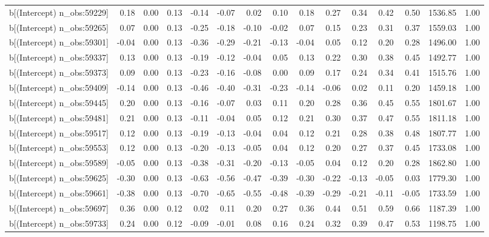 \begin{table}[ht]
\begin{tabular}{rrrrrrrrrrrrrrr}
  b[(Intercept) n\_obs:59229] & 0.18 & 0.00 & 0.13 & -0.14 & -0.07 & 0.02 & 0.10 & 0.18 & 0.27 & 0.34 & 0.42 & 0.50 & 1536.85 & 1.00 \\ 
  b[(Intercept) n\_obs:59265] & 0.07 & 0.00 & 0.13 & -0.25 & -0.18 & -0.10 & -0.02 & 0.07 & 0.15 & 0.23 & 0.31 & 0.37 & 1559.03 & 1.00 \\ 
  b[(Intercept) n\_obs:59301] & -0.04 & 0.00 & 0.13 & -0.36 & -0.29 & -0.21 & -0.13 & -0.04 & 0.05 & 0.12 & 0.20 & 0.28 & 1496.00 & 1.00 \\ 
  b[(Intercept) n\_obs:59337] & 0.13 & 0.00 & 0.13 & -0.19 & -0.12 & -0.04 & 0.05 & 0.13 & 0.22 & 0.30 & 0.38 & 0.45 & 1492.77 & 1.00 \\ 
  b[(Intercept) n\_obs:59373] & 0.09 & 0.00 & 0.13 & -0.23 & -0.16 & -0.08 & 0.00 & 0.09 & 0.17 & 0.24 & 0.34 & 0.41 & 1515.76 & 1.00 \\ 
  b[(Intercept) n\_obs:59409] & -0.14 & 0.00 & 0.13 & -0.46 & -0.40 & -0.31 & -0.23 & -0.14 & -0.06 & 0.02 & 0.11 & 0.20 & 1459.18 & 1.00 \\ 
  b[(Intercept) n\_obs:59445] & 0.20 & 0.00 & 0.13 & -0.16 & -0.07 & 0.03 & 0.11 & 0.20 & 0.28 & 0.36 & 0.45 & 0.55 & 1801.67 & 1.00 \\ 
  b[(Intercept) n\_obs:59481] & 0.21 & 0.00 & 0.13 & -0.11 & -0.04 & 0.05 & 0.12 & 0.21 & 0.30 & 0.37 & 0.47 & 0.55 & 1811.18 & 1.00 \\ 
  b[(Intercept) n\_obs:59517] & 0.12 & 0.00 & 0.13 & -0.19 & -0.13 & -0.04 & 0.04 & 0.12 & 0.21 & 0.28 & 0.38 & 0.48 & 1807.77 & 1.00 \\ 
  b[(Intercept) n\_obs:59553] & 0.12 & 0.00 & 0.13 & -0.20 & -0.13 & -0.05 & 0.04 & 0.12 & 0.20 & 0.27 & 0.37 & 0.45 & 1733.08 & 1.00 \\ 
  b[(Intercept) n\_obs:59589] & -0.05 & 0.00 & 0.13 & -0.38 & -0.31 & -0.20 & -0.13 & -0.05 & 0.04 & 0.12 & 0.20 & 0.28 & 1862.80 & 1.00 \\ 
  b[(Intercept) n\_obs:59625] & -0.30 & 0.00 & 0.13 & -0.63 & -0.56 & -0.47 & -0.39 & -0.30 & -0.22 & -0.13 & -0.05 & 0.03 & 1779.30 & 1.00 \\ 
  b[(Intercept) n\_obs:59661] & -0.38 & 0.00 & 0.13 & -0.70 & -0.65 & -0.55 & -0.48 & -0.39 & -0.29 & -0.21 & -0.11 & -0.05 & 1733.59 & 1.00 \\ 
  b[(Intercept) n\_obs:59697] & 0.36 & 0.00 & 0.12 & 0.02 & 0.11 & 0.20 & 0.27 & 0.36 & 0.44 & 0.51 & 0.59 & 0.66 & 1187.39 & 1.00 \\ 
  b[(Intercept) n\_obs:59733] & 0.24 & 0.00 & 0.12 & -0.09 & -0.01 & 0.08 & 0.16 & 0.24 & 0.32 & 0.39 & 0.47 & 0.53 & 1198.75 & 1.00 \\ 

\end{tabular}
\end{table}

